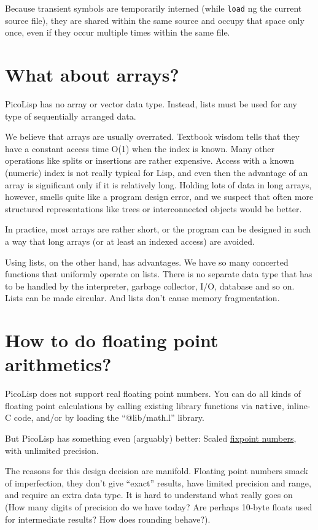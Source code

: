 Because transient symbols are temporarily interned (while \texttt{load} ng the
current source file), they are shared within the same source and occupy
that space only once, even if they occur multiple times within the same
file.

 
\section{What about arrays?}
\label{sec:faq-what-about-arrays?}


PicoLisp has no array or vector data type. Instead, lists must be used
for any type of sequentially arranged data.

We believe that arrays are usually overrated. Textbook wisdom tells that
they have a constant access time O(1) when the index is known. Many
other operations like splits or insertions are rather expensive. Access
with a known (numeric) index is not really typical for Lisp, and even
then the advantage of an array is significant only if it is relatively
long. Holding lots of data in long arrays, however, smells quite like a
program design error, and we suspect that often more structured
representations like trees or interconnected objects would be better.

In practice, most arrays are rather short, or the program can be
designed in such a way that long arrays (or at least an indexed access)
are avoided.

Using lists, on the other hand, has advantages. We have so many
concerted functions that uniformly operate on lists. There is no
separate data type that has to be handled by the interpreter, garbage
collector, I/O, database and so on. Lists can be made circular. And
lists don't cause memory fragmentation.

 
\section{How to do floating point arithmetics?}
\label{sec:faq-how-to-do-floating-point-arithmetics?}


PicoLisp does not support real floating point numbers. You can do all
kinds of floating point calculations by calling existing library
functions via \texttt{native}, inline-C code, and/or by loading the
``@lib/math.l'' library.

But PicoLisp has something even (arguably) better: Scaled
\hyperref[ref.html-num-io]{fixpoint numbers}, with unlimited precision.

The reasons for this design decision are manifold. Floating point
numbers smack of imperfection, they don't give ``exact'' results, have
limited precision and range, and require an extra data type. It is hard
to understand what really goes on (How many digits of precision do we
have today? Are perhaps 10-byte floats used for intermediate results?
How does rounding behave?).

